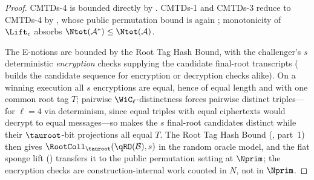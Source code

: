 \begin{proof}
CMTDs-4 is bounded directly by . CMTDs-1 and
CMTDs-3 reduce to CMTDs-4 by , whose
public permutation bound is again ; monotonicity of
$\Lift_c$ absorbs $\Ntot(\mathcal{A}^\ast) \leq \Ntot(\mathcal{A})$.

The E-notions are bounded by the Root Tag Hash Bound, with the
challenger's $s$ deterministic \emph{encryption} checks supplying the
candidate final-root transcripts
( builds the candidate sequence for
encryption or decryption checks alike). On a winning execution all $s$
encryptions are equal, hence of equal length and with one common root tag
$T$; pairwise $\WiC_\ell$-distinctness forces pairwise distinct
triples---for $\ell = 4$ via determinism, since equal triples with equal
ciphertexts would decrypt to equal messages---so 
makes the $s$ final-root candidates distinct while their $\tauroot$-bit
projections all equal $T$. The Root Tag Hash Bound
(, part~1) then gives
$\RootColl_{\tauroot}(\qRO(\mathcal{B}), s)$ in the random oracle model,
and the flat sponge lift () transfers it to the
public permutation setting at $\Nprim$; the encryption checks are
construction-internal work counted in $N$, not in $\Nprim$.
\end{proof}

